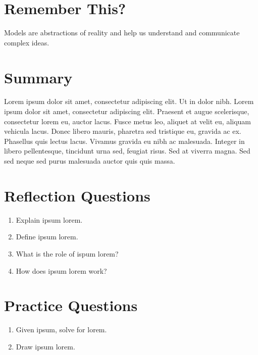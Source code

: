 \documentclass[
]{book}
\providecommand{\tightlist}{%
  \setlength{\itemsep}{0pt}\setlength{\parskip}{0pt}}
\begin{document}
\hypertarget{remember-this}{%
\section*{Remember This?}\label{remember-this}}

Models are abstractions of reality and help us understand and communicate complex ideas.

\hypertarget{summary-5}{%
\section{Summary}\label{summary-5}}

Lorem ipsum dolor sit amet, consectetur adipiscing elit. Ut in dolor nibh. Lorem ipsum dolor sit amet, consectetur adipiscing elit. Praesent et augue scelerisque, consectetur lorem eu, auctor lacus. Fusce metus leo, aliquet at velit eu, aliquam vehicula lacus. Donec libero mauris, pharetra sed tristique eu, gravida ac ex. Phasellus quis lectus lacus. Vivamus gravida eu nibh ac malesuada. Integer in libero pellentesque, tincidunt urna sed, feugiat risus. Sed at viverra magna. Sed sed neque sed purus malesuada auctor quis quis massa.

\hypertarget{reflection-questions-3}{%
\section*{Reflection Questions}\label{reflection-questions-3}}

\begin{enumerate}
\def\labelenumi{\arabic{enumi}.}
\tightlist
\item
  Explain ipsum lorem.
\item
  Define ipsum lorem.
\item
  What is the role of ispum lorem?
\item
  How does ipsum lorem work?
\end{enumerate}

\hypertarget{practice-questions-3}{%
\section*{Practice Questions}\label{practice-questions-3}}

\begin{enumerate}
\def\labelenumi{\arabic{enumi}.}
\setcounter{enumi}{1}
\tightlist
\item
  Given ipsum, solve for lorem.
\item
  Draw ipsum lorem.
\end{enumerate}
\end{document}
